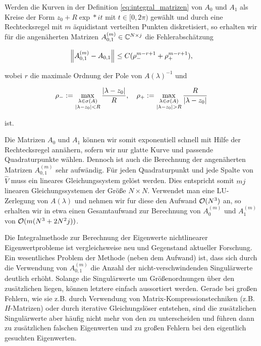 \begin{theorem}

    Werden die Kurven in der Definition \eqref{eq:integral_matrizen} von $A_0$ und $A_1$ als Kreise der Form $z_0 + R \exp*{i t}$ mit $t \in [0, 2 \pi)$ gewählt und durch eine Rechtecksregel mit $m$ äquidistant verteilten Punkten diskretisiert, so erhalten wir für die angenäherten Matrizen $A_{0, 1}^{(m)} \in \mathbb{C}^{N \times j}$ die Fehlerabschätzung

    \begin{align*}
        {\left \| A_{0, 1}^{(m)} - A_{0, 1} \right \|}_{}
        \leq
        C (\rho_-^{m - r + 1} + \rho_+^{m - r + 1}),
    \end{align*}

    wobei $r$ die maximale Ordnung der Pole von $A(\lambda)^{-1}$ und

    \begin{align*}
        \rho_-
        :=
        \max_{\substack{\lambda \in \sigma(A) \\ {\left | \lambda - z_0 \right |} < R}}
            \frac{{\left | \lambda - z_0 \right |}}{R},
        \quad
        \rho_+
        :=
        \max_{\substack{\lambda \in \sigma(A) \\ {\left | \lambda - z_0 \right |} > R}}
            \frac{R}{{\left | \lambda - z_0 \right |}}
    \end{align*}

    ist.

\end{theorem}

Die Matrizen $A_0$ und $A_1$ können wir somit exponentiell schnell mit Hilfe der Rechtecksregel annähern, sofern wir nur glatte Kurve und passende Quadraturpunkte wählen.
Dennoch ist auch die Berechnung der angenäherten Matrizen $A_{0, 1}^{(m)}$ sehr aufwändig.
Für jeden Quadraturpunkt und jede Spalte von $\hat V$ muss ein lineares Gleichungssystem gelöst werden.
Dies entspricht somit $m j$ linearen Gleichungssystemen der Größe $N \times N$.
Verwendet man eine LU-Zerlegung von $A(\lambda)$ und nehmen wir fur diese den Aufwand $\mathcal{O}(N^3)$ an, so erhalten wir in etwa einen Gesamtaufwand zur Berechnung von $A_0^{(m)}$ und $A_1^{(m)}$ von $\mathcal{O}(m (N^3 + 2 N^2 j))$.

Die Integralmethode zur Berechnung der Eigenwerte nichtlinearer Eigenwertprobleme ist vergleichsweise neu und Gegenstand aktueller Forschung.
Ein wesentliches Problem der Methode (neben dem Aufwand) ist, dass sich durch die Verwendung von $A_{0, 1}^{(m)}$ die Anzahl der nicht-verschwindenden Singulärwerte deutlich erhöht.
Solange die  Singulärwerte um Größenordnungen über den zusätzlichen liegen, können letztere einfach aussortiert werden.
Gerade bei großen Fehlern, wie sie z.B. durch Verwendung von Matrix-Kompressionstechniken (z.B. $H$-Matrizen) oder durch iterative Gleichungslöser entstehen, sind die zusätzlichen Singulärwerte aber häufig nicht mehr von den  zu unterscheiden und führen dann zu zusätzlichen falschen Eigenwerten und zu großen Fehlern bei den eigentlich gesuchten Eigenwerten.

